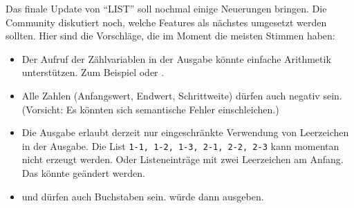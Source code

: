 \documentclass[fontsize=10pt, a4paper, ngerman]{scrartcl}
\begin{document}
\begin{aufgabe}[subtitle=list 6.0]
	\label{aufg:list-v6}
	Das finale Update von \enquote{LIST} soll nochmal einige Neuerungen bringen. Die Community
	diskutiert noch, welche Features als nächstes umgesetzt werden sollten. Hier sind die Vorschläge,
	die im Moment die meisten Stimmen haben:

	\begin{itemize}
		\item Der Aufruf der Zählvariablen in der Ausgabe könnte einfache Arithmetik unterstützen.
			Zum Beispiel  oder .
		\item Alle Zahlen (Anfangswert, Endwert, Schrittweite) dürfen auch negativ sein. (Vorsicht:
			Es könnten sich semantische Fehler einschleichen.)
		\item Die Ausgabe erlaubt derzeit nur eingeschränkte Verwendung von Leerzeichen in der Ausgabe.
			Die List \verb|1-1, 1-2, 1-3, 2-1, 2-2, 2-3| kann momentan nicht erzeugt werden. Oder
			Listeneinträge mit zwei Leerzeichen am Anfang. Das könnte geändert werden.
		\item {} und  dürfen auch Buchstaben sein. 
			würde dann  ausgeben.
	\end{itemize}
\end{aufgabe}
\end{document}
